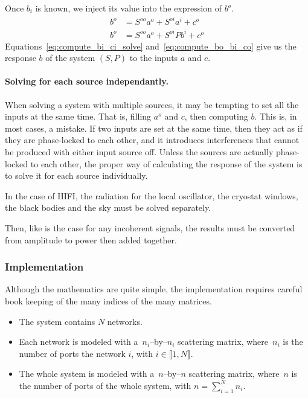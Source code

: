 Once $b_i$ is known, we inject its value into the expression of $b^o$.
\begin{subequations}
    \begin{align}
        b^o &= S^{oo} a^o + S^{oi} a^i + c^o \label{eq:compute_bo_ai_co}\\
        b^o &= S^{oo} a^o + S^{oi} Pb^i + c^o \label{eq:compute_bo_bi_co}
    \end{align}
    \label{eq:compute_bo_co}
\end{subequations}
Equations~\eqref{eq:compute_bi_ci_solve} and~\eqref{eq:compute_bo_bi_co} give us the response $b$ of the system $(S, P)$ to the inputs $a$ and $c$.

\paragraph{Solving for each source independantly.}
When solving a system with multiple sources, it may be tempting to set all the inputs at the same time.
That is, filling $a^o$ and $c$, then computing $b$.
This is, in most cases, a mistake.
If two inputs are set at the same time, then they act as if they are phase-locked to each other, and it introduces interferences that cannot be produced with either input source off.
Unless the sources are actually phase-locked to each other, the proper way of calculating the response of the system is to solve it for each source individually.

In the case of HIFI, the radiation for the local oscillator, the cryostat windows, the black bodies and the sky must be solved separately.

Then, like is the case for any incoherent signals, the results must be converted from amplitude to power then added together.

\subsubsection{Implementation}
Although the mathematics are quite simple, the implementation requires careful book keeping of the many indices of the many matrices.

\begin{itemize}
    \item 
The system contains $N$ networks.
    \item 
Each network is modeled with a~$n_i$--by--$n_i$ scattering matrix, where~$n_i$ is the number of ports the network $i$, with $i \in \llbracket 1, N \rrbracket$.
    \item 
The whole system is modeled with a~$n$--by--$n$ scattering matrix, where~$n$ is the number of ports of the whole system, with $n = \sum_{i=1}^N n_i$.
\end{itemize}

